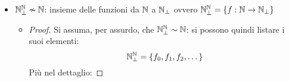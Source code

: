 \begin{itemize}
\begin{itemize}
\begin{proof}
                $S$ non appare nella lista:
                \begin{itemize}
                    \item[\textminus] Differisce dal primo sottoinsieme perchè 
                        $\bar{b_{00}}\neq b_{00}$;
                    \item[\textminus] Differisce dal primo sottoinsieme perchè 
                        $\bar{b_{11}}\neq b_{11}$;
                    \item[\textminus] $\dots$
                    \item[\textminus] Differisce da qualunque elemento nella 
                        {\color{red}diagonale}.
                \end{itemize}
                Si è quindi trovato l'assurdo; ne segue che $2^\N\nsim\N$.\vspace{.5em}
            \end{proof}
        \end{itemize}
    \item $\mathbb{N}^{\mathbb{N}}_\perp\nsim\mathbb{N}$: insieme delle funzioni da $\mathbb{N}$ a $\mathbb{N}_\perp$ ovvero
        $\mathbb{N}^{\mathbb{N}}_\perp = \{f:\mathbb{N}\rightarrow\mathbb{N}_\perp\}$
        \begin{itemize}
            \item[]\begin{proof}
                Si assuma, per assurdo, che $\mathbb{N}^{\mathbb{N}}_\perp\sim\mathbb{N}$: si possono quindi listare i suoi
                elementi:
                $$ \mathbb{N}^{\mathbb{N}}_\perp = \{f_0,f_1,f_2,\dots\} $$
                Più nel dettaglio:


\end{proof}
\end{itemize}
\end{itemize}
